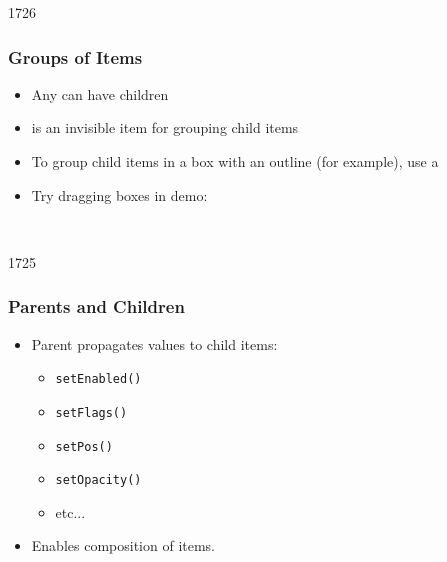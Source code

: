 \begin{slide}{1726}
\frametitle{Groups of Items}
\begin{itemize}

\item Any  can have children 
\item {} is an invisible item for grouping child items
\item To group child items in a box with an outline (for example), use a  
\item Try dragging boxes in demo: 

\end{itemize}
\\
\medskip
{} 
\end{slide}

\begin{slide}{1725}
\frametitle{Parents and Children}
\begin{itemize}
\item Parent propagates values to child items:
    \begin{itemize}
    \item \texttt{setEnabled()}
    \item \texttt{setFlags()}
    \item \texttt{setPos()}
    \item \texttt{setOpacity()}
    \item etc...
    \end{itemize}
\item Enables composition of items.
\end{itemize}
\end{slide}
